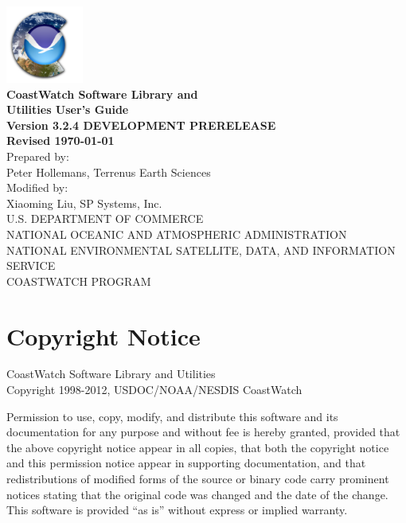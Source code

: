\begin{titlepage}

  \begin{center}
    \includegraphics[height=1in]{icons/cdat.png} \\
    \vspace{0.5cm}
    {\Large \bf CoastWatch Software Library and \\ Utilities User's Guide} \\
    \vspace{1cm}
    {\large \bf Version 3.2.4 DEVELOPMENT PRERELEASE \\ Revised \today} \\
    \vspace{6cm} 
    {\small Prepared by: \\ Peter Hollemans,  
    Terrenus Earth Sciences} \\
    \vspace{0.5cm}
    {\small Modified by: \\ Xiaoming Liu,
    SP Systems, Inc.} \\
    \vspace{2cm}
    {\small U.S. DEPARTMENT OF COMMERCE \\
    NATIONAL OCEANIC AND ATMOSPHERIC ADMINISTRATION \\
    NATIONAL ENVIRONMENTAL SATELLITE, DATA, AND INFORMATION SERVICE \\
    COASTWATCH PROGRAM} \\
  \end{center}

\end{titlepage}


\section*{Copyright Notice}

CoastWatch Software Library and Utilities \\
Copyright 1998-2012, USDOC/NOAA/NESDIS CoastWatch

Permission to use, copy, modify, and distribute this software and
its documentation for any purpose and without fee is hereby granted,
provided that the above copyright notice appear in all copies, that
both the copyright notice and this permission notice appear in
supporting documentation, and that redistributions of modified forms
of the source or binary code carry prominent notices stating that the
original code was changed and the date of the change.  This software
is provided ``as is'' without express or implied warranty.

